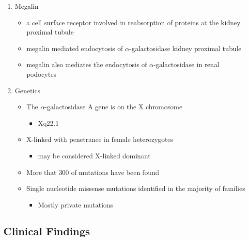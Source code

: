 \documentclass{scrartcl}
\begin{document}
\begin{enumerate}
\item Megalin
\label{sec:org94d5710}
\begin{itemize}
\item a cell surface receptor involved in reabsorption of proteins at the kidney proximal tubule
\item megalin mediated endocytosis of \(\alpha\)-galactosidase kidney proximal tubule
\item megalin also mediates the endocytosis of \(\alpha\)-galactosidase in renal podocytes
\end{itemize}

\item Genetics
\label{sec:orgd366a86}
\begin{itemize}
\item The \(\alpha\)-galactosidase A gene is on the X chromosome
\begin{itemize}
\item Xq22.1
\end{itemize}
\item X-linked with penetrance in female heterozygotes
\begin{itemize}
\item may be considered X-linked dominant
\end{itemize}
\item More that 300 of mutations have been found
\item Single nucleotide missense mutations identified in the majority of families
\begin{itemize}
\item Mostly private mutations
\end{itemize}
\end{itemize}
\end{enumerate}

\subsection{Clinical Findings}
\label{sec:orgbe407c7}
\end{document}
